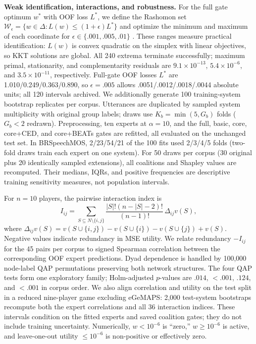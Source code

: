 \documentclass{article}
\begin{document}
\noindent\textbf{Weak identification, interactions, and robustness.} For the full
gate optimum $w^*$ with OOF loss $L^*$, we define the Rashomon set
$\mathcal W_\epsilon=\{w\in\Delta:L(w)\leq(1+\epsilon)L^*\}$ and optimize the
minimum and maximum of each coordinate for
$\epsilon\in\{.001,.005,.01\}$ \cite{fisher2019modelclassreliance}. These
ranges measure practical identification: $L(w)$ is convex quadratic on the
simplex with linear objectives, so KKT solutions are global. All 240 extrema
terminate successfully; maximum primal, stationarity, and complementarity
residuals are $9.1\!\times\!10^{-13}$, $5.4\!\times\!10^{-6}$, and
$3.5\!\times\!10^{-11}$, respectively. Full-gate OOF losses $L^*$ are
1.010/0.249/0.363/0.890, so $\epsilon=.005$ allows .0051/.0012/.0018/.0044
absolute units; all 120 intervals archived.
We additionally generate 100 training-system bootstrap replicates per corpus.
Utterances are duplicated by sampled system multiplicity with original group
labels; draws use $K_b=\min(5,G_b)$ folds ($G_b<2$ redrawn).
Preprocessing, ten experts at $\alpha=10$, and the full, basic, core, core+CED,
and core+BEATs gates are refitted, all evaluated on the unchanged test set. In BRSpeechMOS, 2/23/54/21 of the 100 fits used 2/3/4/5 folds
(two-fold draws train each expert on one system).
For 50 draws per corpus (30 original plus 20 identically sampled extensions),
all coalitions and Shapley values are recomputed.
Their medians, IQRs, and positive frequencies are descriptive training
sensitivity measures, not population intervals.

For $n=10$ players, the pairwise interaction index
\cite{kumar2020shapley,lipovetsky2001bpai} is
\begin{equation}
 I_{ij}=\sum_{S\subseteq N\setminus\{i,j\}}
 \frac{|S|!(n-|S|-2)!}{(n-1)!}\,\Delta_{ij}v(S),
 \label{eq:interaction}
\end{equation}
where $\Delta_{ij}v(S)=v(S\cup\{i,j\})-v(S\cup\{i\})-
v(S\cup\{j\})+v(S)$. Negative values indicate redundancy in MSE utility. We
relate redundancy $-I_{ij}$ for the 45 pairs per corpus to signed Spearman
correlation between the corresponding OOF expert predictions. Dyad dependence is
handled by 100,000 node-label QAP permutations preserving both network
structures. The four QAP tests form one exploratory family; Holm-adjusted
$p$-values are $.014$, $<.001$, $.124$, and $<.001$ in corpus order.
We also align correlation and utility on the test split in a reduced nine-player
game excluding eGeMAPS: 2,000 test-system bootstraps recompute both the expert
correlations and all 36 interaction indices. These intervals condition on the
fitted experts and saved coalition gates; they do not include training uncertainty.
Numerically, $w<10^{-6}$ is ``zero,'' $w\geq10^{-6}$ is active, and
leave-one-out utility $\leq10^{-6}$ is non-positive or effectively zero.
\end{document}
